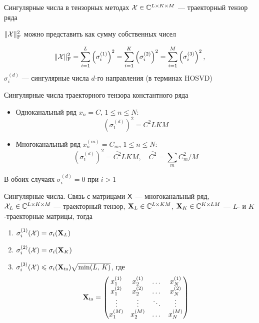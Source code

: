 \documentclass[pdf, unicode, 10pt, notheorems, handout]{beamer}
\newcommand{\bluetext}[1]{{\usebeamercolor[fg]{bluetext_color}#1}}
\begin{document}
\begin{frame}{Сингулярные числа в тензорных методах}
  $\mathcal{X}\in\mathbb{C}^{L\times K\times M}$ --- траекторный тензор ряда\smallskip

  $\|\mathcal{X}\|_{\mathrm{F}}^2$ можно представить как сумму собственных чисел\smallskip

  \[
    \|\mathcal{X}\|^2_{\mathrm{F}} = \sum_{i=1}^L\left(\sigma_{i}^{(1)}\right)^2
    = \sum_{i=1}^K\left(\sigma_{i}^{(2)}\right)^2
    = \sum_{i=1}^M\left(\sigma_{i}^{(3)}\right)^2,
  \]
  $\sigma_i^{(d)}$ --- сингулярные числа $d$-го направления (в
  терминах HOSVD)\medskip

  \bluetext{Сингулярные числа траекторного тензора константного ряда}
  \begin{itemize}
    \item Одноканальный ряд $x_n = C$, $1 \leqslant n \leqslant N$:\\
      \[
        \left(\sigma_1^{(d)}\right)^2 = C^2 LKM
      \] \smallskip
    \item Многоканальный ряд $x_n^{(m)} = C_m$, $1 \leqslant n
      \leqslant N$:\\
      \[
        \left(\sigma_1^{(d)}\right)^2 = \overline{C^2} LKM, \quad
        \overline{C^2} =
        \sum_m C_m^2 / M
      \]
  \end{itemize}
  В обоих случаях $\sigma_i^{(d)} = 0$ при $i > 1$
\end{frame}

\begin{frame}{Сингулярные числа. Связь с матрицами}
  $\mathsf{X}$ --- многоканальный ряд, $\mathcal{X}_L\in\mathbb{C}^{L\times K\times M}$
  --- траекторный тензор,
  $\mathbf{X}_L\in \mathbb{C}^{L\times KM}$, $\mathbf{X}_K\in \mathbb{C}^{K\times LM}$ ---
  $L$- и $K$-траекторные матрицы, тогда\smallskip

  \begin{enumerate}
    \item $\sigma_i^{(1)}(\mathcal{X}) = \sigma_i(\mathbf{X}_L)$\smallskip
    \item $\sigma_i^{(2)}(\mathcal{X}) = \sigma_i(\mathbf{X}_K)$\smallskip
    \item $\sigma_i^{(3)}(\mathcal{X}) \leqslant
      \sigma_i(\mathbf{X}_{\mathrm{ts}})\sqrt{\min(L,\, K)}$, где
      \[
        \mathbf{X}_{\mathrm{ts}} =
        \begin{pmatrix}
          x_1^{(1)} & x_2^{(1)} & \dots & x_N^{(1)}\\
          x_1^{(2)} & x_2^{(2)} & \dots & x_N^{(2)}\\
          \vdots & \vdots & \ddots & \vdots\\
          x_1^{(M)} & x_2^{(M)} & \dots & x_N^{(M)}
        \end{pmatrix}
      \]
  \end{enumerate}
\end{frame}
\end{document}
